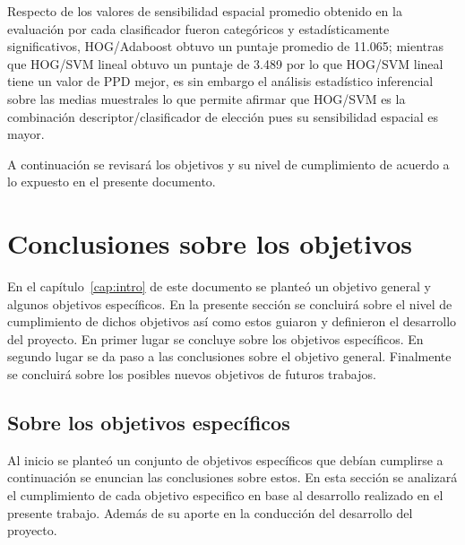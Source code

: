Respecto de los valores de sensibilidad espacial promedio obtenido en la evaluación por cada clasificador fueron categóricos y estadísticamente significativos, HOG/Adaboost obtuvo un puntaje promedio de 11.065; mientras que HOG/SVM lineal obtuvo un puntaje de 3.489 por lo que HOG/SVM lineal tiene un valor de PPD mejor, es sin embargo el análisis estadístico inferencial sobre las medias muestrales lo que permite afirmar que  HOG/SVM es la combinación descriptor/clasificador de elección pues su sensibilidad espacial es mayor. 

A continuación se revisará los objetivos y su nivel de cumplimiento de acuerdo a lo expuesto en el presente documento.

\section{Conclusiones sobre los objetivos}

En el capítulo~\ref{cap:intro} de este documento se planteó un objetivo general y algunos objetivos específicos. En la presente sección se concluirá sobre el nivel de cumplimiento de dichos objetivos así como estos guiaron y definieron el desarrollo del proyecto. En primer lugar se concluye sobre los objetivos específicos. En segundo lugar se da paso a las conclusiones sobre el objetivo general. Finalmente se concluirá sobre los posibles nuevos objetivos de futuros trabajos.


\subsection{Sobre los objetivos específicos}

Al inicio se planteó un conjunto de objetivos específicos que debían cumplirse a continuación se enuncian las conclusiones sobre estos. En esta sección se analizará el cumplimiento de cada objetivo especifico en base al desarrollo realizado en el presente trabajo. Además de su aporte en la conducción del desarrollo del proyecto.


